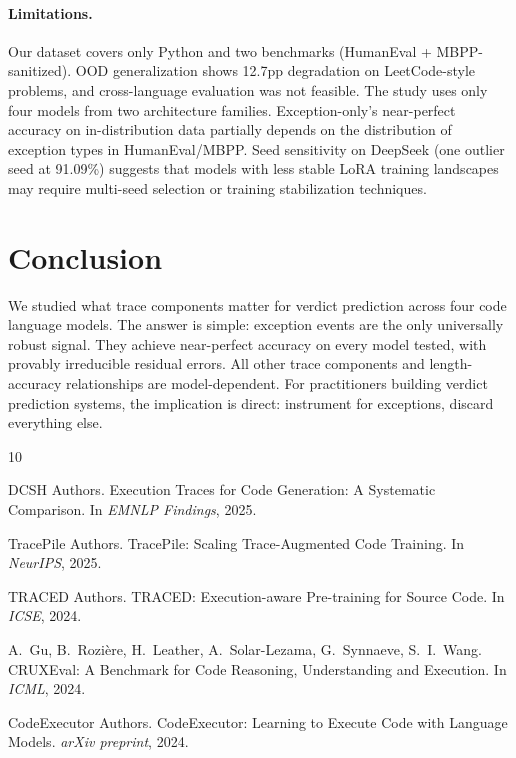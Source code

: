 \documentclass[11pt]{article}
\begin{document}
\paragraph{Limitations.}
Our dataset covers only Python and two benchmarks (HumanEval + MBPP-sanitized). OOD generalization shows 12.7pp degradation on LeetCode-style problems, and cross-language evaluation was not feasible. The study uses only four models from two architecture families. Exception-only's near-perfect accuracy on in-distribution data partially depends on the distribution of exception types in HumanEval/MBPP. Seed sensitivity on DeepSeek (one outlier seed at 91.09\%) suggests that models with less stable LoRA training landscapes may require multi-seed selection or training stabilization techniques.

\section{Conclusion}
\label{sec:conclusion}

We studied what trace components matter for verdict prediction across four code language models. The answer is simple: exception events are the only universally robust signal. They achieve near-perfect accuracy on every model tested, with provably irreducible residual errors. All other trace components and length-accuracy relationships are model-dependent. For practitioners building verdict prediction systems, the implication is direct: instrument for exceptions, discard everything else.


\begin{thebibliography}{10}

DCSH Authors.
\newblock Execution Traces for Code Generation: A Systematic Comparison.
\newblock In \emph{EMNLP Findings}, 2025.

TracePile Authors.
\newblock TracePile: Scaling Trace-Augmented Code Training.
\newblock In \emph{NeurIPS}, 2025.

TRACED Authors.
\newblock TRACED: Execution-aware Pre-training for Source Code.
\newblock In \emph{ICSE}, 2024.

A.~Gu, B.~Rozière, H.~Leather, A.~Solar-Lezama, G.~Synnaeve, S.~I.~Wang.
\newblock CRUXEval: A Benchmark for Code Reasoning, Understanding and Execution.
\newblock In \emph{ICML}, 2024.

CodeExecutor Authors.
\newblock CodeExecutor: Learning to Execute Code with Language Models.
\newblock \emph{arXiv preprint}, 2024.

\end{thebibliography}
\end{document}
